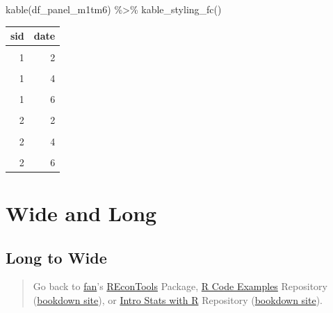 \documentclass[
]{book}
\newenvironment{Shaded}{\begin{snugshade}}{\end{snugshade}}
\newcommand{\FunctionTok}[1]{\textcolor[rgb]{0.00,0.00,0.00}{#1}}
\newcommand{\NormalTok}[1]{#1}
\newcommand{\SpecialCharTok}[1]{\textcolor[rgb]{0.00,0.00,0.00}{#1}}
\begin{document}
\begin{Shaded}
\begin{Highlighting}[]
\FunctionTok{kable}\NormalTok{(df\_panel\_m1tm6) }\SpecialCharTok{\%\textgreater{}\%}
  \FunctionTok{kable\_styling\_fc}\NormalTok{()}
\end{Highlighting}
\end{Shaded}

\begin{table}[!h]
\centering
\begin{tabular}{r|r}
\hline
sid & date\\
\hline
\cellcolor{gray!6}{1} & \cellcolor{gray!6}{1}\\
\hline
1 & 2\\
\hline
\cellcolor{gray!6}{1} & \cellcolor{gray!6}{3}\\
\hline
1 & 4\\
\hline
\cellcolor{gray!6}{1} & \cellcolor{gray!6}{5}\\
\hline
1 & 6\\
\hline
\cellcolor{gray!6}{2} & \cellcolor{gray!6}{1}\\
\hline
2 & 2\\
\hline
\cellcolor{gray!6}{2} & \cellcolor{gray!6}{3}\\
\hline
2 & 4\\
\hline
\cellcolor{gray!6}{2} & \cellcolor{gray!6}{5}\\
\hline
2 & 6\\
\hline
\end{tabular}
\end{table}

\hypertarget{wide-and-long}{%
\section{Wide and Long}\label{wide-and-long}}

\hypertarget{long-to-wide}{%
\subsection{Long to Wide}\label{long-to-wide}}

\begin{quote}
Go back to \href{http://fanwangecon.github.io/}{fan}'s \href{https://fanwangecon.github.io/REconTools/}{REconTools} Package, \href{https://fanwangecon.github.io/R4Econ/}{R Code Examples} Repository (\href{https://fanwangecon.github.io/R4Econ/bookdown}{bookdown site}), or \href{https://fanwangecon.github.io/Stat4Econ/}{Intro Stats with R} Repository (\href{https://fanwangecon.github.io/Stat4Econ/bookdown}{bookdown site}).
\end{quote}
\end{document}
